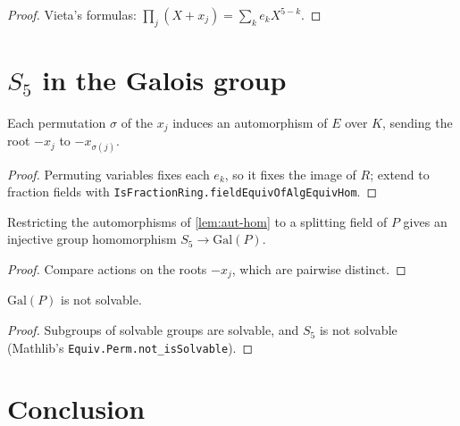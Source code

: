 \begin{proof}
  \leanok
  Vieta's formulas: $\prod_j (X + x_j) = \sum_k e_k X^{5-k}$.
\end{proof}

\section{\texorpdfstring{$S_5$}{S5} in the Galois group}

\begin{lemma}
  \label{lem:aut-hom}
  \leanok
  Each permutation $\sigma$ of the $x_j$ induces an automorphism of $E$ over $K$,
  sending the root $-x_j$ to $-x_{\sigma(j)}$.
\end{lemma}

\begin{proof}
  \leanok
  Permuting variables fixes each $e_k$, so it fixes the image of $R$; extend to fraction
  fields with \texttt{IsFractionRing.fieldEquivOfAlgEquivHom}.
\end{proof}

\begin{lemma}
  \label{lem:gal-hom-injective}
  \leanok
  Restricting the automorphisms of \cref{lem:aut-hom} to a splitting field of $P$ gives an
  injective group homomorphism $S_5 \to \mathrm{Gal}(P)$.
\end{lemma}

\begin{proof}
  \leanok
  Compare actions on the roots $-x_j$, which are pairwise distinct.
\end{proof}

\begin{corollary}
  \label{cor:gal-not-solvable}
  \leanok
  $\mathrm{Gal}(P)$ is not solvable.
\end{corollary}

\begin{proof}
  \leanok
  Subgroups of solvable groups are solvable, and $S_5$ is not solvable
  (Mathlib's \texttt{Equiv.Perm.not\_isSolvable}).
\end{proof}

\section{Conclusion}

